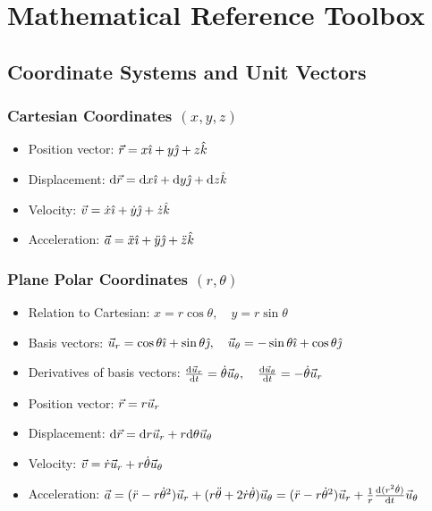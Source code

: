 \chapter{Mathematical Reference Toolbox}
\label{app:math}

\section{Coordinate Systems and Unit Vectors}

\subsection{Cartesian Coordinates $(x, y, z)$}
\begin{itemize}[leftmargin=1.4em,itemsep=2pt]
  \item Position vector: $\vec{r} = x\hat{\imath} + y\hat{\jmath} + z\hat{k}$
  \item Displacement: $\mathrm{d}\vec{r} = \mathrm{d} x\hat{\imath} + \mathrm{d} y\hat{\jmath} + \mathrm{d} z\hat{k}$
  \item Velocity: $\vec{v} = \dot{x}\hat{\imath} + \dot{y}\hat{\jmath} + \dot{z}\hat{k}$
  \item Acceleration: $\vec{a} = \ddot{x}\hat{\imath} + \ddot{y}\hat{\jmath} + \ddot{z}\hat{k}$
\end{itemize}

\subsection{Plane Polar Coordinates $(r, \theta)$}
\begin{itemize}[leftmargin=1.4em,itemsep=2pt]
  \item Relation to Cartesian: $x = r\cos\theta, \quad y = r\sin\theta$
  \item Basis vectors: $\vec{u}_r = \cos\theta\hat{\imath} + \sin\theta\hat{\jmath}, \quad \vec{u}_\theta = -\sin\theta\hat{\imath} + \cos\theta\hat{\jmath}$
  \item Derivatives of basis vectors: $\frac{\mathrm{d}\vec{u}_r}{\mathrm{d} t} = \dot{\theta}\vec{u}_\theta, \quad \frac{\mathrm{d}\vec{u}_\theta}{\mathrm{d} t} = -\dot{\theta}\vec{u}_r$
  \item Position vector: $\vec{r} = r\vec{u}_r$
  \item Displacement: $\mathrm{d}\vec{r} = \mathrm{d} r\vec{u}_r + r\mathrm{d}\theta\vec{u}_\theta$
  \item Velocity: $\vec{v} = \dot{r}\vec{u}_r + r\dot{\theta}\vec{u}_\theta$
  \item Acceleration: $\vec{a} = (\ddot{r} - r\dot{\theta}^2)\vec{u}_r + (r\ddot{\theta} + 2\dot{r}\dot{\theta})\vec{u}_\theta = (\ddot{r} - r\dot{\theta}^2)\vec{u}_r + \frac{1}{r}\frac{\mathrm{d}(r^2\dot{\theta})}{\mathrm{d} t}\vec{u}_\theta$
\end{itemize}

